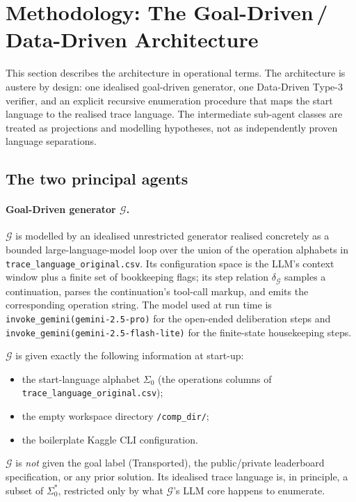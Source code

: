 \section{\texorpdfstring{Methodology: The Goal-Driven\,/\,Data-Driven Architecture}{Methodology: The Goal-Driven/Data-Driven Architecture}}
\label{sec:methodology}

This section describes the architecture in operational terms.
The architecture is austere by design: one idealised goal-driven
generator, one Data-Driven Type-3 verifier, and an explicit
recursive enumeration procedure that maps the start language to
the realised trace language.  The intermediate sub-agent classes are treated as
projections and modelling hypotheses, not as independently proven
language separations.

\subsection{The two principal agents}

\paragraph{Goal-Driven generator $\mathcal{G}$.}
$\mathcal{G}$ is modelled by an idealised unrestricted
generator realised concretely as a bounded large-language-model loop over the union of the operation
alphabets in \texttt{trace\_language\_original.csv}.  Its
configuration space is the LLM's context window plus a finite
set of bookkeeping flags; its step relation
$\delta_\mathcal{G}$ samples a continuation, parses the
continuation's tool-call markup, and emits the corresponding
operation string.  The model used at run time is
\texttt{invoke\_gemini(gemini-2.5-pro)} for the open-ended deliberation
steps and \texttt{invoke\_gemini(gemini-2.5-flash-lite)} for the
finite-state housekeeping steps.

$\mathcal{G}$ is given exactly the following information at
start-up:
\begin{itemize}
\item the start-language alphabet
$\Sigma_0$ (the operations columns of
\texttt{trace\_language\_original.csv});
\item the empty workspace directory \texttt{/comp\_dir/};
\item the boilerplate Kaggle CLI configuration.
\end{itemize}
$\mathcal{G}$ is \emph{not} given the goal label
(\textsf{Transported}), the public/private leaderboard
specification, or any prior solution.  Its idealised trace language is, in
principle, a subset of $\Sigma_0^*$, restricted only by what
$\mathcal{G}$'s LLM core happens to enumerate.

